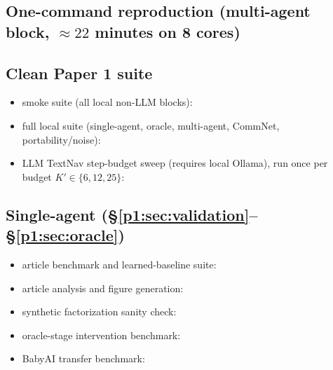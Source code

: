 \documentclass{article}
\begin{document}
\subsection*{One-command reproduction (multi-agent block, $\approx 22$ minutes on 8 cores)}

\subsection*{Clean Paper 1 suite}
\begin{itemize}[leftmargin=16pt]
\item smoke suite (all local non-LLM blocks): 
\item full local suite (single-agent, oracle, multi-agent, CommNet, portability/noise): 
\item LLM TextNav step-budget sweep (requires local Ollama), run once per budget $K'\in\{6,12,25\}$: 
\end{itemize}

\subsection*{Single-agent (\S\ref{p1:sec:validation}--\S\ref{p1:sec:oracle})}
\begin{itemize}[leftmargin=16pt]
\item article benchmark and learned-baseline suite: 
\item article analysis and figure generation: 
\item synthetic factorization sanity check: 
\item oracle-stage intervention benchmark: 
\item BabyAI transfer benchmark: 
\end{itemize}
\end{document}
